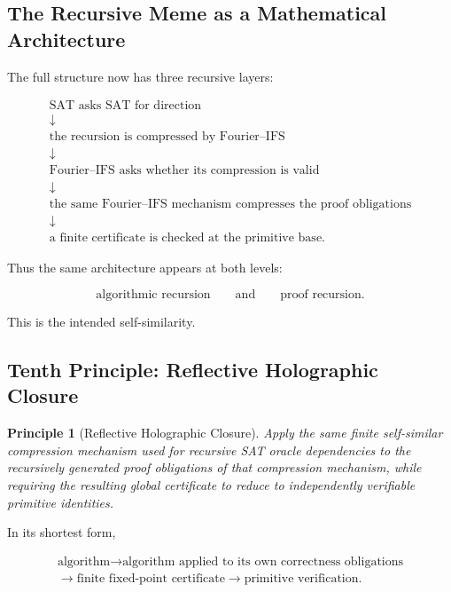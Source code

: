 \documentclass[11pt]{article}
\theoremstyle{plain}
\newtheorem{principle}[theorem]{Principle}
\theoremstyle{definition}
\begin{document}
\subsection{The Recursive Meme as a Mathematical Architecture}

The full structure now has three recursive layers:

\[
\boxed{
\begin{array}{c}
\text{SAT asks SAT for direction}\\
\downarrow\\
\text{the recursion is compressed by Fourier--IFS}\\
\downarrow\\
\text{Fourier--IFS asks whether its compression is valid}\\
\downarrow\\
\text{the same Fourier--IFS mechanism compresses the proof obligations}\\
\downarrow\\
\text{a finite certificate is checked at the primitive base}.
\end{array}
}
\]

Thus the same architecture appears at both levels:

\[
\boxed{
\text{algorithmic recursion}
\qquad\text{and}\qquad
\text{proof recursion}.
}
\]

This is the intended self-similarity.

\subsection{Tenth Principle: Reflective Holographic Closure}

\begin{principle}[Reflective Holographic Closure]
\label{principle:reflective-holographic-closure}
Apply the same finite self-similar compression mechanism used for recursive
SAT oracle dependencies to the recursively generated proof obligations of
that compression mechanism, while requiring the resulting global certificate
to reduce to independently verifiable primitive identities.
\end{principle}

In its shortest form,

\[
\boxed{\begin{gathered}
\text{algorithm}\longrightarrow\text{algorithm applied to its own correctness obligations}\\
\longrightarrow\text{finite fixed-point certificate}\longrightarrow\text{primitive verification}.
\end{gathered}}
\]
\end{document}
